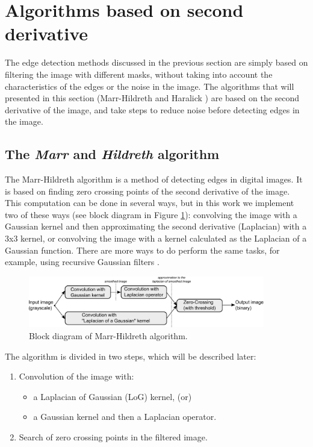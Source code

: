 \documentclass{ipol}
\numberwithin{equation}{section}
\numberwithin{table}{section}
\begin{document}

\section{Algorithms based on second derivative}
\label{sec:second}

The edge detection methods discussed in the previous section are simply based on filtering the 
image with different masks, without taking into account the characteristics of the edges or 
the noise in the image.
The algorithms that will presented in this section (Marr-Hildreth \cite{segm:edge_region:marr:84:digital_step} and Haralick \cite{bb20239}) 
are based on the second derivative of the image, and take steps to reduce noise before 
detecting edges in the image.


\subsection{The \textit{Marr} and \textit{Hildreth} algorithm}

The Marr-Hildreth algorithm is a method of detecting edges in digital 
images. It is based on finding zero crossing points of the second derivative
of the image. This computation can be done in several ways, but in this work we implement two of these ways  (see block diagram in Figure \ref{fig:blockdiagram2}): convolving the image with a Gaussian kernel and then 
approximating the second derivative (Laplacian) with a 3x3 kernel, or 
convolving the image with a kernel calculated as the Laplacian of a 
Gaussian function. There are more ways to do perform the same tasks, for example, using 
recursive Gaussian filters \cite{Deriche1993Recursively}. 

\begin{figure}[!b]
	\centering
	\includegraphics[width=0.92\textwidth]{blockdiagram2.pdf}
	\caption{Block diagram of Marr-Hildreth algorithm.}
	\label{fig:blockdiagram2}
\end{figure}

The algorithm is divided in two steps, which will be described later:
\begin{enumerate}
	\item Convolution of the image with:
	\begin{itemize}
		\item a Laplacian of Gaussian (LoG) kernel, (or)
		\item a Gaussian kernel and then a Laplacian operator.
	\end{itemize}
	\item Search of zero crossing points in the filtered image.
\end{enumerate}
\end{document}
